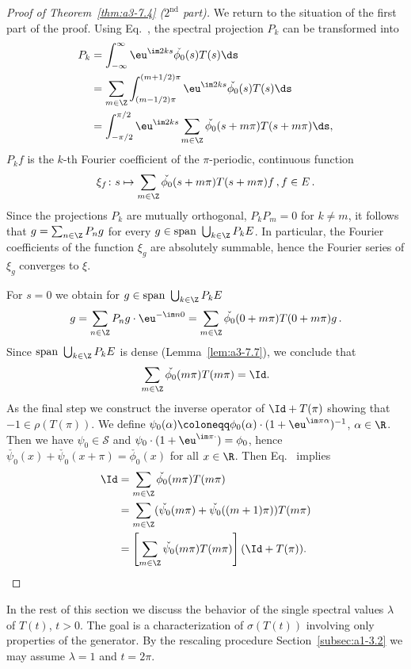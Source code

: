 \begin{proof}[Proof of Theorem~\ref{thm:a3-7.4} ($ 2^{\text{nd}} $ part)]
We return to the situation of the first part of the proof.
Using Eq.~, the spectral projection $P_{k}$ can be transformed into
\begin{align*}
P_{k} &= \int_{-\infty}^{\infty} \eu^{\im 2ks}\check{\phi_{0}}(s)T(s)\ds \\
&= \sum_{m\in\Z} \int_{(m-1/2)\pi}^{(m+1/2)\pi} \eu^{\im 2ks}\check{\phi_{0}}(s)T(s)\ds \\
&= \int_{-\pi/2}^{\pi/2} \eu^{\im 2ks}\sum_{m\in\Z}\check{\phi_{0}}(s+m\pi)T(s+m\pi)\ds ,
\end{align*}
\ie $P_{k}f$ is the $k$-th Fourier coefficient of the $\pi$-periodic, continuous function 
\[
\xi_{f} \colon s \mapsto \sum_{m\in\Z} \check{\phi_{0}}(s+m\pi)T(s+m\pi)f\,, f \in E\,.
\]
Since the projections $P_{k}$ are mutually orthogonal, \ie $P_{k}P_{m} = 0$ for $k \neq m$, it follows that $g = \sum_{n\in\Z} P_{n}g$ for every $g \in \text{span }\bigcup_{k\in\Z} P_{k}E$.
In particular, the Fourier coefficients of the function $\xi_{g}$ are absolutely summable, hence the Fourier series of\/ $\xi_{g}$ converges to $\xi$.

For $s = 0$ we obtain for 
$g \in \text{span }\bigcup_{k\in\Z} P_{k}E$
\[
g = \sum_{n\in\Z} P_{n}g\cdot \eu^{-\im n0} = \sum_{m\in\Z} \check{\phi_{0}}(0 + m\pi)T(0 + m\pi)g\,.
\]
Since $\text{span }\bigcup_{k\in\Z} P_{k}E$ is dense (Lemma~\ref{lem:a3-7.7}), we conclude that
\begin{equation}\label{eq:a3-7.6}
\sum_{m\in\Z} \check{\phi_{0}}(m\pi)T(m\pi) = \Id .
\end{equation}
As the final step we construct the inverse operator of\/ $\Id + T(\pi)$ showing that $-1 \in \rho(T(\pi))$.
We define $\psi_{0}(\alpha) \coloneqq \phi_{0}(\alpha)\cdot(1 + \eu^{\im\pi\alpha})^{-1}$, $\alpha \in \R$.
Then we have $\psi_{0} \in \mathcal{S}$ and $\psi_{0}\cdot(1 + \eu^{\im\pi\cdot}) = \phi_{0}$,
hence $\check{\psi_{0}}(x) + \check{\psi_{0}}(x + \pi) = \check{\phi_{0}}(x)$ for all $x \in \R$.
Then Eq.~ implies
\begin{align*}
\Id &= \sum_{m\in\Z} \check{\phi_{0}}(m\pi)T(m\pi) \\
&= \sum_{m\in\Z} (\check{\psi_{0}}(m\pi) + \check{\psi_{0}}((m+1)\pi))T(m\pi) \\
&= \left[ \sum_{m\in\Z} \check{\psi_{0}}(m\pi)T(m\pi) \right] (\Id + T(\pi)) . \qedhere
\end{align*}
\end{proof}
In the rest of this section we discuss the behavior of the single spectral values $\lambda$ of\/ $T(t)$, $t > 0$.
The goal is a characterization of\/ $\sigma(T(t))$ involving only properties of the generator.
By the rescaling procedure Section~\ref{subsec:a1-3.2} we may assume $\lambda = 1$ and $t = 2\pi$.

